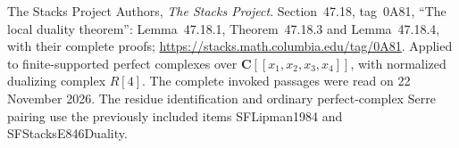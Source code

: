 The Stacks Project Authors, \emph{The Stacks Project}.
Section~47.18, tag~0A81, ``The local duality theorem'':
Lemma~47.18.1, Theorem~47.18.3 and Lemma~47.18.4,
with their complete proofs;
\url{https://stacks.math.columbia.edu/tag/0A81}.
Applied to finite-supported perfect complexes over
\(\mathbf C[[x_1,x_2,x_3,x_4]]\), with normalized dualizing complex
\(R[4]\). The complete invoked passages were read on 22 November 2026.
The residue identification and ordinary perfect-complex Serre pairing
use the previously included items SFLipman1984 and SFStacksE846Duality.
